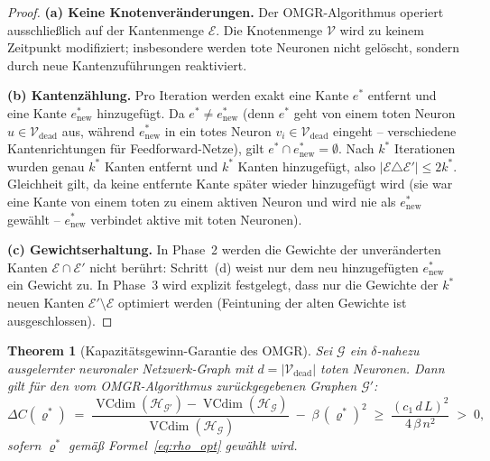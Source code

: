﻿\documentclass[12pt, a4paper, openany]{report}
\newtheorem{theorem}{Theorem}[chapter]
\newcommand{\calG}{\mathcal{G}}
\newcommand{\calH}{\mathcal{H}}
\newcommand{\calV}{\mathcal{V}}
\newcommand{\calE}{\mathcal{E}}
\DeclareMathOperator{\VC}{VCdim}
\begin{document}
\begin{proof}
\textbf{(a) Keine Knotenveränderungen.}
Der OMGR-Algorithmus operiert ausschließlich auf der Kantenmenge $\calE$.
Die Knotenmenge $\calV$ wird zu keinem Zeitpunkt modifiziert; insbesondere
werden tote Neuronen nicht gelöscht, sondern durch neue Kantenzuführungen
reaktiviert.

\textbf{(b) Kantenzählung.}
Pro Iteration werden exakt eine Kante $e^*$ entfernt und eine Kante
$e_{\mathrm{new}}^*$ hinzugefügt.  Da $e^* \neq e_{\mathrm{new}}^*$
(denn $e^*$ geht von einem toten Neuron $u \in \calV_{\mathrm{dead}}$ aus,
während $e_{\mathrm{new}}^*$ in ein totes Neuron $v_i \in \calV_{\mathrm{dead}}$
eingeht -- verschiedene Kantenrichtungen für Feedforward-Netze), gilt
$e^* \cap e_{\mathrm{new}}^* = \emptyset$.
Nach $k^*$ Iterationen wurden genau $k^*$ Kanten entfernt und $k^*$
Kanten hinzugefügt, also $|\calE \triangle \calE'| \leq 2k^*$.
Gleichheit gilt, da keine entfernte Kante später wieder hinzugefügt wird
(sie war eine Kante von einem toten zu einem aktiven Neuron und wird nie
als $e_{\mathrm{new}}^*$ gewählt -- $e_{\mathrm{new}}^*$ verbindet aktive
mit toten Neuronen).

\textbf{(c) Gewichtserhaltung.}
In Phase~2 werden die Gewichte der unveränderten Kanten $\calE \cap \calE'$ 
nicht berührt: Schritt~(d) weist nur dem neu hinzugefügten $e_{\mathrm{new}}^*$
ein Gewicht zu.  In Phase~3 wird explizit festgelegt, dass nur
die Gewichte der $k^*$ neuen Kanten $\calE' \setminus \calE$ optimiert werden
(Feintuning der alten Gewichte ist ausgeschlossen).
\end{proof}

\begin{theorem}[Kapazitätsgewinn-Garantie des OMGR]
\label{thm:omgr_capacity}
Sei $\calG$ ein $\delta$-nahezu ausgelernter neuronaler Netzwerk-Graph mit
$d = |\calV_{\mathrm{dead}}|$ toten Neuronen.  Dann gilt für den vom
OMGR-Algorithmus zurückgegebenen Graphen $\calG'$:
\begin{equation}
  \label{eq:omgr_capacity}
  \Delta C(\varrho^*)
  \;=\;
  \frac{\VC(\calH_{\calG'}) - \VC(\calH_{\calG})}{\VC(\calH_{\calG})}
  \;-\; \beta\,(\varrho^*)^2
  \;\geq\;
  \frac{(c_1\,d\,L)^2}{4\,\beta\,n^2}
  \;>\; 0,
\end{equation}
sofern $\varrho^*$ gemäß Formel~\eqref{eq:rho_opt} gewählt wird.
\end{theorem}
\end{document}

